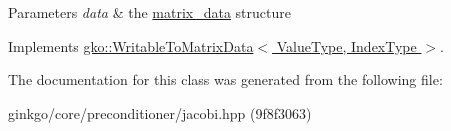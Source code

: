 \begin{DoxyParams}{Parameters}
{\em data} & the \hyperlink{structgko_1_1matrix__data}{matrix\+\_\+data} structure \\
\hline
\end{DoxyParams}


Implements \hyperlink{classgko_1_1WritableToMatrixData_a96036c3a4bf4c67fa93002808b8b14e2}{gko\+::\+Writable\+To\+Matrix\+Data$<$ Value\+Type, Index\+Type $>$}.



The documentation for this class was generated from the following file\+:\begin{DoxyCompactItemize}
\item 
ginkgo/core/preconditioner/jacobi.\+hpp (9f8f3063)\end{DoxyCompactItemize}
